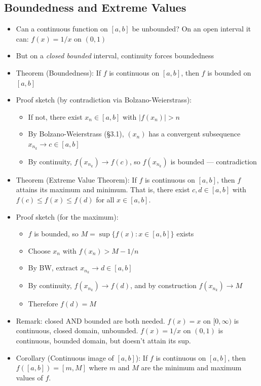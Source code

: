 \documentclass[
  10pt,
  letterpaper,
]{scrbook}
\providecommand{\tightlist}{%
  \setlength{\itemsep}{0pt}\setlength{\parskip}{0pt}}
\begin{document}
\subsection{Boundedness and Extreme
Values}\label{boundedness-and-extreme-values}

\begin{itemize}
\tightlist
\item
  Can a continuous function on \([a,b]\) be unbounded? On an open
  interval it can: \(f(x) = 1/x\) on \((0,1)\)
\item
  But on a \emph{closed bounded} interval, continuity forces boundedness
\item
  Theorem (Boundedness): If \(f\) is continuous on \([a,b]\), then \(f\)
  is bounded on \([a,b]\)
\item
  Proof sketch (by contradiction via Bolzano-Weierstrass):

  \begin{itemize}
  \tightlist
  \item
    If not, there exist \(x_n \in [a,b]\) with \(|f(x_n)| > n\)
  \item
    By Bolzano-Weierstrass (§3.1), \((x_n)\) has a convergent
    subsequence \(x_{n_k} \to c \in [a,b]\)
  \item
    By continuity, \(f(x_{n_k}) \to f(c)\), so \(f(x_{n_k})\) is bounded
    --- contradiction
  \end{itemize}
\item
  Theorem (Extreme Value Theorem): If \(f\) is continuous on \([a,b]\),
  then \(f\) attains its maximum and minimum. That is, there exist
  \(c, d \in [a,b]\) with \(f(c) \leq f(x) \leq f(d)\) for all
  \(x \in [a,b]\).
\item
  Proof sketch (for the maximum):

  \begin{itemize}
  \tightlist
  \item
    \(f\) is bounded, so \(M = \sup\{f(x) : x \in [a,b]\}\) exists
  \item
    Choose \(x_n\) with \(f(x_n) > M - 1/n\)
  \item
    By BW, extract \(x_{n_k} \to d \in [a,b]\)
  \item
    By continuity, \(f(x_{n_k}) \to f(d)\), and by construction
    \(f(x_{n_k}) \to M\)
  \item
    Therefore \(f(d) = M\)
  \end{itemize}
\item
  Remark: closed AND bounded are both needed. \(f(x) = x\) on
  \([0, \infty)\) is continuous, closed domain, unbounded.
  \(f(x) = 1/x\) on \((0,1)\) is continuous, bounded domain, but doesn't
  attain its sup.
\item
  Corollary (Continuous image of \([a,b]\)): If \(f\) is continuous on
  \([a,b]\), then \(f([a,b]) = [m, M]\) where \(m\) and \(M\) are the
  minimum and maximum values of \(f\).


\end{itemize}
\end{document}
